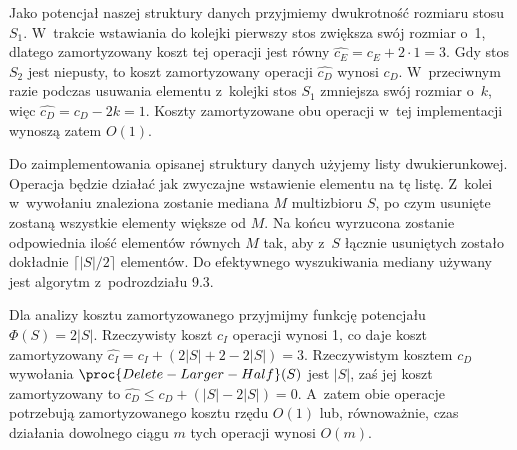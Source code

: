 Jako potencjał naszej struktury danych przyjmiemy dwukrotność rozmiaru stosu $S_1$.
W~trakcie wstawiania do kolejki pierwszy stos zwiększa swój rozmiar o~1, dlatego zamortyzowany koszt tej operacji jest równy $\widehat{c_E}=c_E+2\cdot1=3$.
Gdy stos $S_2$ jest niepusty, to koszt zamortyzowany operacji  $\widehat{c_D}$ wynosi $c_D$.
W~przeciwnym razie podczas usuwania elementu z~kolejki stos $S_1$ zmniejsza swój rozmiar o~$k$, więc $\widehat{c_D}=c_D-2k=1$.
Koszty zamortyzowane obu operacji w~tej implementacji wynoszą zatem $O(1)$.

\exercise %

\noindent Do zaimplementowania opisanej struktury danych użyjemy listy dwukierunkowej.
Operacja  będzie działać jak zwyczajne wstawienie elementu na tę listę.
Z~kolei w~wywołaniu  znaleziona zostanie mediana $M$ multizbioru $S$, po czym usunięte zostaną wszystkie elementy większe od $M$.
Na końcu wyrzucona zostanie odpowiednia ilość elementów równych $M$ tak, aby z~$S$ łącznie usuniętych zostało dokładnie $\lceil|S|/2\rceil$ elementów.
Do efektywnego wyszukiwania mediany używany jest algorytm  z~podrozdziału 9.3.

Dla analizy kosztu zamortyzowanego przyjmijmy funkcję potencjału $\Phi(S)=2|S|$.
Rzeczywisty koszt $c_I$ operacji  wynosi 1, co daje koszt zamortyzowany $\widehat{c_I}=c_I+(2|S|+2-2|S|)=3$.
Rzeczywistym kosztem $c_D$ wywołania $\proc{Delete-Larger-Half}(S)$ jest $|S|$, zaś jej koszt zamortyzowany to $\widehat{c_D}\le c_D+(|S|-2|S|)=0$.
A~zatem obie operacje potrzebują zamortyzowanego kosztu rzędu $O(1)$ lub, równoważnie, czas działania dowolnego ciągu $m$ tych operacji wynosi $O(m)$.
